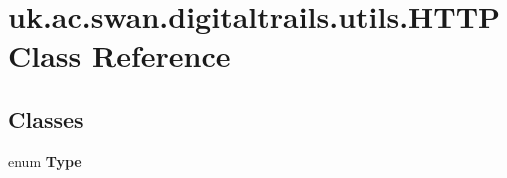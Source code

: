 \hypertarget{classuk_1_1ac_1_1swan_1_1digitaltrails_1_1utils_1_1_h_t_t_p}{\section{uk.\+ac.\+swan.\+digitaltrails.\+utils.\+H\+T\+T\+P Class Reference}
\label{classuk_1_1ac_1_1swan_1_1digitaltrails_1_1utils_1_1_h_t_t_p}
}
\subsection*{Classes}
\begin{DoxyCompactItemize}
\item 
enum {\bfseries Type}
\end{DoxyCompactItemize}
